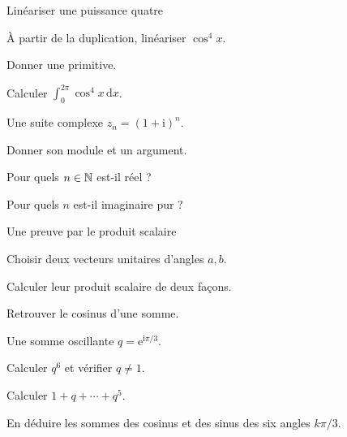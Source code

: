 \begingroup\renewcommand{\otBesoinPlace}[1]{}\begin{minipage}{\linewidth}
\begin{exercice}[3]{Linéariser une puissance quatre}

\begin{questions}
\item À partir de la duplication, linéariser $\cos^4x$.
\item Donner une primitive.
\item Calculer $\int_0^{2\pi}\cos^4x\,\mathrm dx$.
\end{questions}
\end{exercice}
\begin{exercice}[3]{Une suite complexe}
$z_n=(1+\mathrm i)^n$.
\begin{questions}
\item Donner son module et un argument.
\item Pour quels $n\in\mathbb{N}$ est-il réel ?
\item Pour quels $n$ est-il imaginaire pur ?
\end{questions}
\end{exercice}
\begin{exercice}[3]{Une preuve par le produit scalaire}

\begin{questions}
\item Choisir deux vecteurs unitaires d’angles $a,b$.
\item Calculer leur produit scalaire de deux façons.
\item Retrouver le cosinus d’une somme.
\end{questions}
\end{exercice}
\begin{exercice}[3]{Une somme oscillante}
$q=\mathrm e^{\mathrm i\pi/3}$.
\begin{questions}
\item Calculer $q^6$ et vérifier $q\ne1$.
\item Calculer $1+q+\cdots+q^5$.
\item En déduire les sommes des cosinus et des sinus des six angles $k\pi/3$.
\end{questions}
\end{exercice}
\end{minipage}\endgroup
